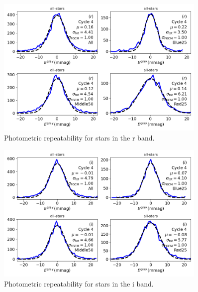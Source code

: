 \begin{figure}
  \begin{center}
    \includegraphics[width=0.9\textwidth]{photometric_calibration_figures/repeatability_r.png}
  \end{center}
  \caption{Photometric repeatability for stars in the r band.}
\end{figure}

\begin{figure}
  \begin{center}
    \includegraphics[width=0.9\textwidth]{photometric_calibration_figures/repeatability_i.png}
  \end{center}
  \caption{Photometric repeatability for stars in the i band.}
\end{figure}

